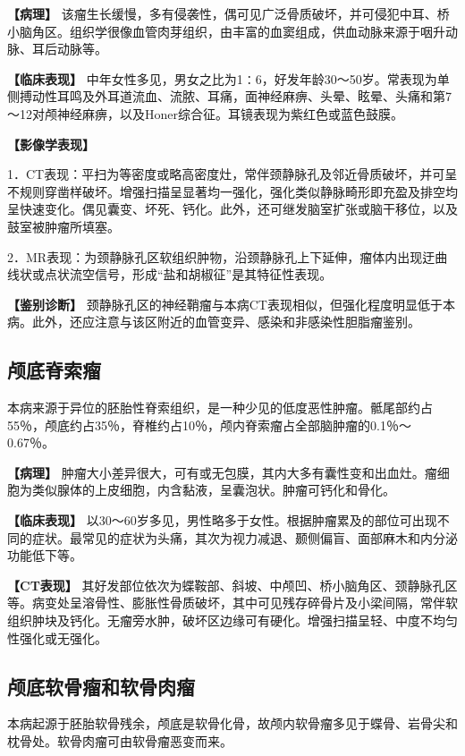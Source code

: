 \textbf{【病理】}
该瘤生长缓慢，多有侵袭性，偶可见广泛骨质破坏，并可侵犯中耳、桥小脑角区。组织学很像血管肉芽组织，由丰富的血窦组成，供血动脉来源于咽升动脉、耳后动脉等。

\textbf{【临床表现】}
中年女性多见，男女之比为1∶6，好发年龄30～50岁。常表现为单侧搏动性耳鸣及外耳道流血、流脓、耳痛，面神经麻痹、头晕、眩晕、头痛和第7～12对颅神经麻痹，以及Honer综合征。耳镜表现为紫红色或蓝色鼓膜。

\textbf{【影像学表现】}

1．CT表现：平扫为等密度或略高密度灶，常伴颈静脉孔及邻近骨质破坏，并可呈不规则穿凿样破坏。增强扫描呈显著均一强化，强化类似静脉畸形即充盈及排空均呈快速变化。偶见囊变、坏死、钙化。此外，还可继发脑室扩张或脑干移位，以及鼓室被肿瘤所填塞。

2．MR表现：为颈静脉孔区软组织肿物，沿颈静脉孔上下延伸，瘤体内出现迂曲线状或点状流空信号，形成“盐和胡椒征”是其特征性表现。

\textbf{【鉴别诊断】}
颈静脉孔区的神经鞘瘤与本病CT表现相似，但强化程度明显低于本病。此外，还应注意与该区附近的血管变异、感染和非感染性胆脂瘤鉴别。

\subsection{颅底脊索瘤}

本病来源于异位的胚胎性脊索组织，是一种少见的低度恶性肿瘤。骶尾部约占55％，颅底约占35％，脊椎约占10％，颅内脊索瘤占全部脑肿瘤的0.1％～0.67％。

\textbf{【病理】}
肿瘤大小差异很大，可有或无包膜，其内大多有囊性变和出血灶。瘤细胞为类似腺体的上皮细胞，内含黏液，呈囊泡状。肿瘤可钙化和骨化。

\textbf{【临床表现】}
以30～60岁多见，男性略多于女性。根据肿瘤累及的部位可出现不同的症状。最常见的症状为头痛，其次为视力减退、颞侧偏盲、面部麻木和内分泌功能低下等。

\textbf{【CT表现】}
其好发部位依次为蝶鞍部、斜坡、中颅凹、桥小脑角区、颈静脉孔区等。病变处呈溶骨性、膨胀性骨质破坏，其中可见残存碎骨片及小梁间隔，常伴软组织肿块及钙化。无瘤旁水肿，破坏区边缘可有硬化。增强扫描呈轻、中度不均匀性强化或无强化。

\subsection{颅底软骨瘤和软骨肉瘤}

本病起源于胚胎软骨残余，颅底是软骨化骨，故颅内软骨瘤多见于蝶骨、岩骨尖和枕骨处。软骨肉瘤可由软骨瘤恶变而来。

